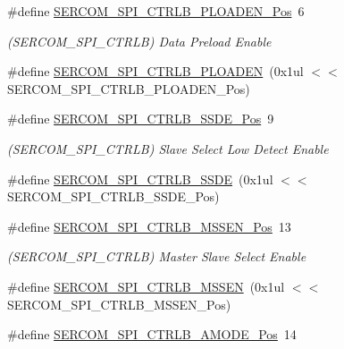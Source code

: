 \begin{DoxyCompactItemize}
\item 
\#define \mbox{\hyperlink{group___s_a_m_d21___s_e_r_c_o_m_ga360c363f5807b2fc40b905e3b61bff2c}{S\+E\+R\+C\+O\+M\+\_\+\+S\+P\+I\+\_\+\+C\+T\+R\+L\+B\+\_\+\+P\+L\+O\+A\+D\+E\+N\+\_\+\+Pos}}~6
\begin{DoxyCompactList}\small\item\em (S\+E\+R\+C\+O\+M\+\_\+\+S\+P\+I\+\_\+\+C\+T\+R\+LB) Data Preload Enable \end{DoxyCompactList}\item 
\#define \mbox{\hyperlink{group___s_a_m_d21___s_e_r_c_o_m_ga2c58504671f7e78f8418ab2b1869b35b}{S\+E\+R\+C\+O\+M\+\_\+\+S\+P\+I\+\_\+\+C\+T\+R\+L\+B\+\_\+\+P\+L\+O\+A\+D\+EN}}~(0x1ul $<$$<$ S\+E\+R\+C\+O\+M\+\_\+\+S\+P\+I\+\_\+\+C\+T\+R\+L\+B\+\_\+\+P\+L\+O\+A\+D\+E\+N\+\_\+\+Pos)
\item 
\#define \mbox{\hyperlink{group___s_a_m_d21___s_e_r_c_o_m_ga2c0679bf5f5bc3c353faca2688a45ffd}{S\+E\+R\+C\+O\+M\+\_\+\+S\+P\+I\+\_\+\+C\+T\+R\+L\+B\+\_\+\+S\+S\+D\+E\+\_\+\+Pos}}~9
\begin{DoxyCompactList}\small\item\em (S\+E\+R\+C\+O\+M\+\_\+\+S\+P\+I\+\_\+\+C\+T\+R\+LB) Slave Select Low Detect Enable \end{DoxyCompactList}\item 
\#define \mbox{\hyperlink{group___s_a_m_d21___s_e_r_c_o_m_gae5ed76496c9e95515b6f2b48d4d7764c}{S\+E\+R\+C\+O\+M\+\_\+\+S\+P\+I\+\_\+\+C\+T\+R\+L\+B\+\_\+\+S\+S\+DE}}~(0x1ul $<$$<$ S\+E\+R\+C\+O\+M\+\_\+\+S\+P\+I\+\_\+\+C\+T\+R\+L\+B\+\_\+\+S\+S\+D\+E\+\_\+\+Pos)
\item 
\#define \mbox{\hyperlink{group___s_a_m_d21___s_e_r_c_o_m_gae02169992bebf70ec79f3381361ea43d}{S\+E\+R\+C\+O\+M\+\_\+\+S\+P\+I\+\_\+\+C\+T\+R\+L\+B\+\_\+\+M\+S\+S\+E\+N\+\_\+\+Pos}}~13
\begin{DoxyCompactList}\small\item\em (S\+E\+R\+C\+O\+M\+\_\+\+S\+P\+I\+\_\+\+C\+T\+R\+LB) Master Slave Select Enable \end{DoxyCompactList}\item 
\#define \mbox{\hyperlink{group___s_a_m_d21___s_e_r_c_o_m_ga7936fb2746ff3b7d9906b8ea0882d062}{S\+E\+R\+C\+O\+M\+\_\+\+S\+P\+I\+\_\+\+C\+T\+R\+L\+B\+\_\+\+M\+S\+S\+EN}}~(0x1ul $<$$<$ S\+E\+R\+C\+O\+M\+\_\+\+S\+P\+I\+\_\+\+C\+T\+R\+L\+B\+\_\+\+M\+S\+S\+E\+N\+\_\+\+Pos)
\item 
\#define \mbox{\hyperlink{group___s_a_m_d21___s_e_r_c_o_m_ga48799d0ce0df98d60ec4c7cbddfbabe9}{S\+E\+R\+C\+O\+M\+\_\+\+S\+P\+I\+\_\+\+C\+T\+R\+L\+B\+\_\+\+A\+M\+O\+D\+E\+\_\+\+Pos}}~14
$$
\end{DoxyCompactItemize}
